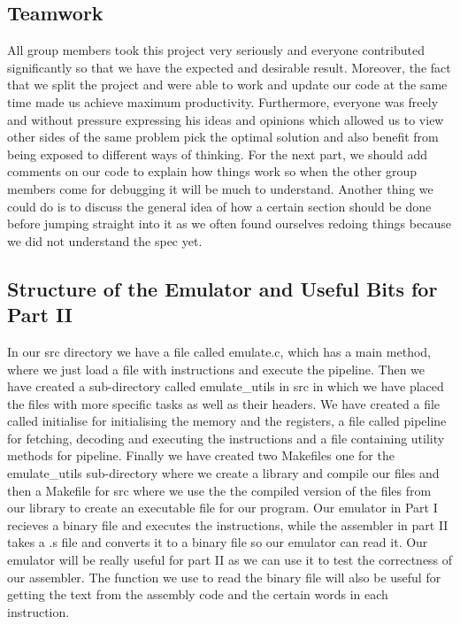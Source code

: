 \documentclass{article}
\begin{document}
\subsection{Teamwork}
All group members took this project very seriously and everyone contributed significantly so that we 
have the expected and desirable result. Moreover, the fact that we split the project and were able to work 
and update our code at the same time made us achieve maximum productivity. Furthermore, everyone was freely and 
without pressure expressing his ideas and opinions which allowed us to view other sides of the same problem pick 
the optimal solution and also benefit from being exposed to different ways of thinking. For the next part, we should
add comments on our code to explain how things work so when the other group members come for debugging it will be much 
to understand. Another thing we could do is to discuss the general idea of how a certain section should be done 
 before jumping straight into it as we often found ourselves redoing things because we did not understand the
spec yet. 

\bigskip
\subsection{Structure of the Emulator and Useful Bits for Part II}
In our src directory we have a file called emulate.c, which has a main method, 
where we just load a file with instructions and execute the pipeline. 
Then we have created a sub-directory called emulate{\_}utils in src in which 
we have placed the files with more specific tasks as well as their headers. 
We have created a file called initialise for initialising the memory and the registers, 
a file called pipeline for fetching, decoding and executing the instructions and a file containing utility methods for pipeline. 
Finally we have created two Makefiles one for the emulate{\_}utils sub-directory where we create a library 
and compile our files and then a Makefile for src where we use the the compiled version of the files from our library 
to create an executable file for our program. Our emulator in Part I recieves a binary file and executes the instructions, 
while the assembler in part II takes a .s file and converts it to a binary file so our emulator can read it. Our emulator 
will be really useful for part II as we can use it to test the correctness of our assembler. The function we use to read the 
binary file will also be useful for getting the text from the assembly code and the certain words in each instruction.
\end{document}
